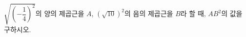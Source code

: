 $\sqrt{\left(-\dfrac{1}{4}\right)^2}$의 양의 제곱근을 $A$, $(\sqrt{10})^2$의 음의 제곱근을 $B$라 할 때, $AB^2$의 값을 구하시오.
